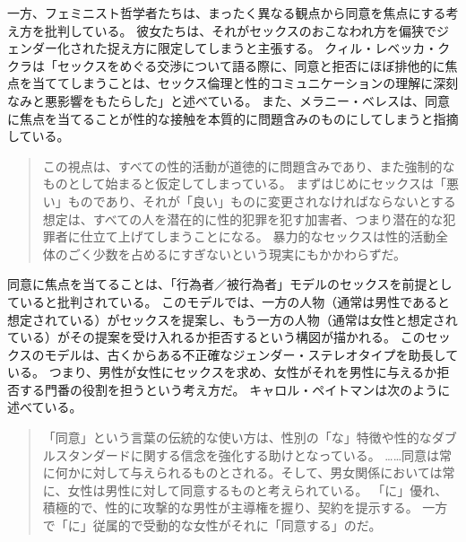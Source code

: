 \documentclass[paper=a4,book,openany]{jlreq}
\begin{document}
一方、フェミニスト哲学者たちは、まったく異なる観点から同意を焦点にする考え方を批判している。
彼女たちは、それがセックスのおこなわれ方を偏狭でジェンダー化された捉え方に限定してしまうと主張する。
クィル・レベッカ・ククラは「セックスをめぐる交渉について語る際に、同意と拒否にほぼ排他的に焦点を当ててしまうことは、セックス倫理と性的コミュニケーションの理解に深刻なみと悪影響をもたらした」と述べている\citep[p.75]{kukla18:_thats_what_she_said}。
また、メラニー・ベレスは、同意に焦点を当てることが性的な接触を本質的に問題含みのものにしてしまうと指摘している。

\begin{quote}
この視点は、すべての性的活動が道徳的に問題含みであり、また強制的なものとして始まると仮定してしまっている。
まずはじめにセックスは「悪い」ものであり、それが「良い」ものに変更されなければならないとする想定は、すべての人を潜在的に性的犯罪を犯す加害者、つまり潜在的な犯罪者に仕立て上げてしまうことになる。
暴力的なセックスは性的活動全体のごく少数を占めるにすぎないという現実にもかかわらずだ。
\citep[p.102]{beres07:_spont_sexual_consen}
\end{quote}

同意に焦点を当てることは、「行為者／被行為者」モデルのセックスを前提としていると批判されている。
このモデルでは、一方の人物（通常は男性であると想定されている）がセックスを提案し、もう一方の人物（通常は女性と想定されている）がその提案を受け入れるか拒否するという構図が描かれる。
このセックスのモデルは、古くからある不正確なジェンダー・ステレオタイプを助長している。
つまり、男性が女性にセックスを求め、女性がそれを男性に与えるか拒否する門番の役割を担うという考え方だ。
キャロル・ペイトマンは次のように述べている。

\begin{quote}
「同意」という言葉の伝統的な使い方は、性別の「な」特徴や性的なダブルスタンダードに関する信念を強化する助けとなっている。
……同意は常に何かに対して与えられるものとされる。そして、男女関係においては常に、女性は男性に対して同意するものと考えられている。
「に」優れ、積極的で、性的に攻撃的な男性が主導権を握り、契約を提示する。
一方で「に」従属的で受動的な女性がそれに「同意する」のだ。
\citep[p.164]{pateman80:_woman_consen}
\end{quote}
\end{document}
